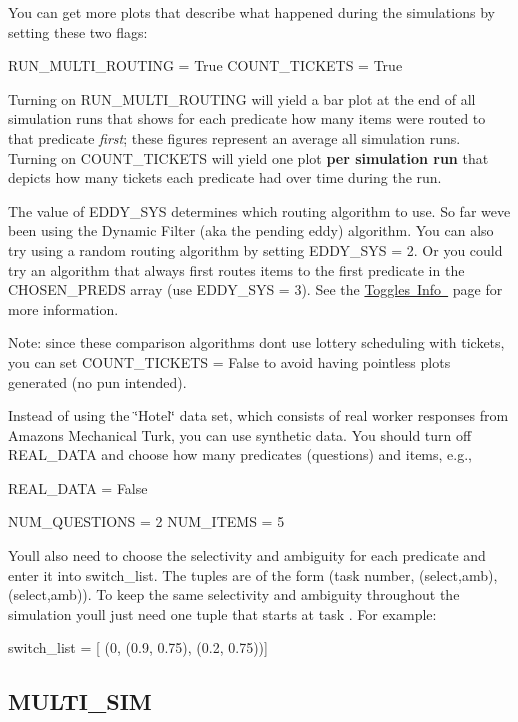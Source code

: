 \begin{DoxyItemize}
\item You can get more plots that describe what happened during the simulations by setting these two flags\+: \begin{DoxyVerb}RUN_MULTI_ROUTING = True
COUNT_TICKETS = True
\end{DoxyVerb}


Turning on {\ttfamily R\+U\+N\+\_\+\+M\+U\+L\+T\+I\+\_\+\+R\+O\+U\+T\+I\+NG} will yield a bar plot at the end of all simulation runs that shows for each predicate how many items were routed to that predicate {\itshape first}; these figures represent an average all simulation runs. Turning on {\ttfamily C\+O\+U\+N\+T\+\_\+\+T\+I\+C\+K\+E\+TS} will yield one plot {\bfseries per simulation run} that depicts how many tickets each predicate had over time during the run.
\item The value of {\ttfamily E\+D\+D\+Y\+\_\+\+S\+YS} determines which routing algorithm to use. So far we\textquotesingle{}ve been using the Dynamic Filter (aka the pending eddy) algorithm. You can also try using a random routing algorithm by setting {\ttfamily E\+D\+D\+Y\+\_\+\+S\+YS = 2}. Or you could try an algorithm that always first routes items to the first predicate in the C\+H\+O\+S\+E\+N\+\_\+\+P\+R\+E\+DS array (use {\ttfamily E\+D\+D\+Y\+\_\+\+S\+YS = 3}). See the \mbox{\hyperlink{toggles}{Toggles Info }} page for more information.

Note\+: since these comparison algorithms don\textquotesingle{}t use lottery scheduling with tickets, you can set {\ttfamily C\+O\+U\+N\+T\+\_\+\+T\+I\+C\+K\+E\+TS = False} to avoid having pointless plots generated (no pun intended).
\item Instead of using the \char`\"{}\+Hotel\char`\"{} data set, which consists of real worker responses from Amazon\textquotesingle{}s Mechanical Turk, you can use synthetic data. You should turn off {\ttfamily R\+E\+A\+L\+\_\+\+D\+A\+TA} and choose how many predicates (questions) and items, e.\+g., \begin{DoxyVerb}REAL_DATA = False

NUM_QUESTIONS = 2
NUM_ITEMS = 5
\end{DoxyVerb}


You\textquotesingle{}ll also need to choose the selectivity and ambiguity for each predicate and enter it into {\ttfamily switch\+\_\+list}. The tuples are of the form {\ttfamily (task number, (select,amb), (select,amb))}. To keep the same selectivity and ambiguity throughout the simulation you\textquotesingle{}ll just need one tuple that starts at task {}. For example\+: \begin{DoxyVerb}switch_list = [ (0, (0.9, 0.75), (0.2, 0.75))]
\end{DoxyVerb}

\end{DoxyItemize}\hypertarget{install_info_MULTI_SIM}{}\subsection{M\+U\+L\+T\+I\+\_\+\+S\+IM}\label{install_info_MULTI_SIM}

